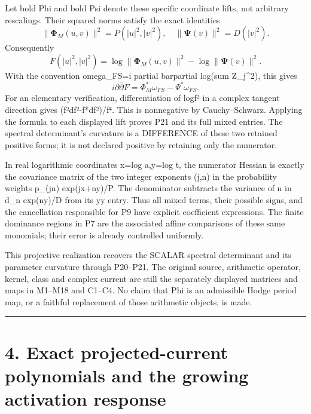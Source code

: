 Let bold Phi and bold Psi denote these specific coordinate lifts, not arbitrary rescalings. Their squared norms satisfy the exact identities \[
 \|\boldsymbol\Phi_M(u,v)\|^2=P(|u|^2,|v|^2),\quad
 \|\boldsymbol\Psi(v)\|^2=D(|v|^2).
\] Consequently \[
 \boxed{F(|u|^2,|v|^2)
 =\log\|\boldsymbol\Phi_M(u,v)\|^2
  -\log\|\boldsymbol\Psi(v)\|^2.}\tag{P20}
\] With the convention omega\_FS=i partial barpartial log(sum \textbar Z\_j\textbar\^{}2), this gives \[
 \boxed{i\partial\bar\partial F
 =\Phi_M^*\omega_{FS}-\Psi^*\omega_{FS}.}\tag{P21}
\] For an elementary verification, differentiation of log\textbar\textbar f\textbar\textbar² in a complex tangent direction gives (\textbar\textbar f\textbar\textbar²\textbar\textbar df\textbar\textbar²-\textbar f*df\textbar²)/\textbar\textbar f\textbar\textbar⁴. This is nonnegative by Cauchy--Schwarz. Applying the formula to each displayed lift proves P21 and its full mixed entries. The spectral determinant's curvature is a DIFFERENCE of these two retained positive forms; it is not declared positive by retaining only the numerator.

In real logarithmic coordinates x=log a,y=log t, the numerator Hessian is exactly the covariance matrix of the two integer exponents (j,n) in the probability weights p\_(jn) exp(jx+ny)/P. The denominator subtracts the variance of n in d\_n exp(ny)/D from its yy entry. Thus all mixed terms, their possible signs, and the cancellation responsible for P9 have explicit coefficient expressions. The finite dominance regions in P7 are the associated affine comparisons of these same monomials; their error is already controlled uniformly.

This projective realization recovers the SCALAR spectral determinant and its parameter curvature through P20--P21. The original source, arithmetic operator, kernel, class and complex current are still the separately displayed matrices and maps in M1--M18 and C1--C4. No claim that Phi is an admissible Hodge period map, or a faithful replacement of those arithmetic objects, is made.

\begin{center}\rule{0.5\linewidth}{0.5pt}\end{center}

\section{4. Exact projected-current polynomials and the growing activation response}\label{exact-projected-current-polynomials-and-the-growing-activation-response}

